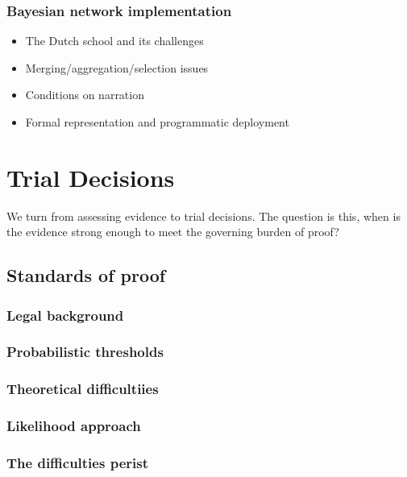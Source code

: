 \documentclass[]{book}
\begin{document}
\section{Bayesian network implementation}


\begin{itemize}
\item
  The Dutch school and its challenges
\item
  Merging/aggregation/selection issues
\item
  Conditions on narration
\item
  Formal representation and programmatic deployment
\end{itemize}

\part{Trial Decisions}

We turn from assessing
evidence to trial decisions.
The question is this, when is the evidence strong
enough to meet the governing burden of proof?

\chapter{Standards of proof}

\section{Legal background}

\section{Probabilistic thresholds}

\section{Theoretical difficultiies}

\section{Likelihood approach}

\section{The difficulties perist}
\end{document}

